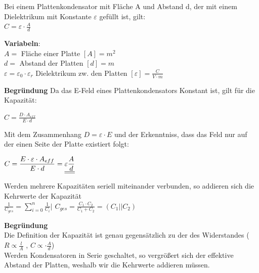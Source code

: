 \begingl
Bei einem Plattenkondensator mit Fläche A und Abstand d, der mit einem Dielektrikum mit Konstante $\varepsilon$ gefüllt ist, gilt: \\
\formulaBegin
$ \displaystyle C = \varepsilon \cdot \frac{A}{ d}$
\formulaEnd

\textbf{Variabeln}: \\
$A = $ Fläche einer Platte $ [A] = m^2 $ \\
$d = $ Abstand der Platten $ [d] = m$ \\
$ \varepsilon = \varepsilon_0 \cdot \varepsilon_r $ Dielektrikum zw. den Platten $ [\varepsilon] = \frac{C}{V\cdot m}$ \\

\iend

\textbf{Begründung}
Da das E-Feld eines Plattenkondensators Konstant ist, gilt für die Kapazität:
\fix
\fix
\begin{center}
	$ C= \displaystyle \frac{D \cdot A_{eff} } {E \cdot d} $
\end{center}
\fix
\fix
Mit dem Zusammenhang $ D = \varepsilon \cdot E$ und der Erkenntniss, dass das Feld nur auf der einen Seite der Platte existiert folgt:
\fix \fix
\begin{center}
	$ C= \displaystyle \frac{E \cdot \varepsilon \cdot A_{eff} } {E  \cdot d}  = \underline{\underline{\displaystyle \varepsilon \frac{A} { d}}}$
\end{center}




\beginip
Werden mehrere Kapazitäten seriell miteinander verbunden, so addieren sich die Kehrwerte der Kapazität \\
\formulaBegin
$\displaystyle \frac{1}{C_{ges}} = \sum_{i=0}^n \frac{1}{C_i} \Bigg\rvert$
$\displaystyle C_{ges} = \frac{C_1 \cdot C_2}{C_1 + C_2} = (C_1 || C_2)$
\formulaEnd
\iend


\textbf{Begründung} \\
Die Definition der Kapazität ist genau gegensätzlich zu der des Widerstandes ($ R \propto \frac{l}{A}$ , $ C \propto \cdot \frac{A}{d} $)\\
Werden Kondensatoren in Serie geschaltet, so vergrößert sich der effektive Abstand der Platten, weshalb wir die Kehrwerte addieren müssen. \\




